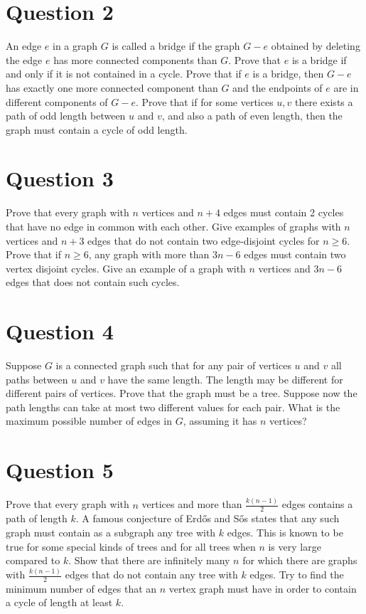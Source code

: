 \documentclass[12pt]{report}
\begin{document}
\section*{Question 2}
An edge $e$ in a graph $G$ is called a bridge if the graph $G - e$ obtained by deleting the edge $e$ has more connected components than $G$. Prove that $e$ is a bridge if and only if it is not contained in a cycle. Prove that if $e$ is a bridge, then $G - e$ has exactly one more connected component than $G$ and the endpoints of $e$ are in different components of $G - e$. Prove that if for some vertices $u, v$ there exists a path of odd length between $u$ and $v$, and also a path of even length, then the graph must contain a cycle of odd length.
\section*{Question 3}
Prove that every graph with $n$ vertices and $n + 4$ edges must contain 2 cycles that have no edge in common with each other. Give examples of graphs with $n$ vertices and $n + 3$ edges that do not contain two edge-disjoint cycles for $n \geq 6$. Prove that if $n \geq 6$, any graph with more than $3n - 6$ edges must contain two vertex disjoint cycles. Give an example of a graph with $n$ vertices and $3n - 6$ edges that does not contain such cycles.
\section*{Question 4}
Suppose $G$ is a connected graph such that for any pair of vertices $u$ and $v$ all paths between $u$ and $v$ have the same length. The length may be different for different pairs of vertices. Prove that the graph must be a tree. Suppose now the path lengths can take at most two different values for each pair. What is the maximum possible number of edges in $G$, assuming it has $n$ vertices?
\section*{Question 5}
Prove that every graph with $n$ vertices and more than $\frac{k(n - 1)}{2}$ edges contains a path of length $k$. A famous conjecture of Erdős and Sős states that any such graph must contain as a subgraph any tree with $k$ edges. This is known to be true for some special kinds of trees and for all trees when $n$ is very large compared to $k$. Show that there are infinitely many $n$ for which there are graphs with $\frac{k(n - 1)}{2}$ edges that do not contain any tree with $k$ edges. Try to find the minimum number of edges that an $n$ vertex graph must have in order to contain a cycle of length at least $k$.
\end{document}

